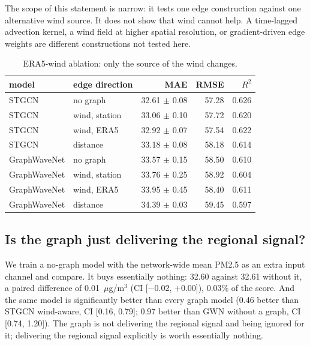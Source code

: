 \documentclass[11pt,a4paper]{article}
\begin{document}
The scope of this statement is narrow: it tests one edge construction against
one alternative wind source.  It does not show that wind cannot help.  A
time-lagged advection kernel, a wind field at higher spatial resolution, or
gradient-driven edge weights are different constructions not tested here.

\begin{table}[htbp]
\centering
\caption{ERA5-wind ablation: only the source of the wind changes.}
\label{tab:era5}
\begin{tabular}{llrrr}
\toprule
model & edge direction & MAE & RMSE & $R^2$ \\
\midrule
STGCN          & no graph         & 32.61 $\pm$ 0.08 & 57.28 & 0.626 \\
STGCN          & wind, station    & 33.06 $\pm$ 0.10 & 57.72 & 0.620 \\
STGCN          & wind, ERA5       & 32.92 $\pm$ 0.07 & 57.54 & 0.622 \\
STGCN          & distance         & 33.18 $\pm$ 0.08 & 58.18 & 0.614 \\
GraphWaveNet   & no graph         & 33.57 $\pm$ 0.15 & 58.50 & 0.610 \\
GraphWaveNet   & wind, station    & 33.76 $\pm$ 0.25 & 58.92 & 0.604 \\
GraphWaveNet   & wind, ERA5       & 33.95 $\pm$ 0.45 & 58.40 & 0.611 \\
GraphWaveNet   & distance         & 34.39 $\pm$ 0.03 & 59.45 & 0.597 \\
\bottomrule
\end{tabular}
\end{table}

\subsection{Is the graph just delivering the regional signal?}

We train a no-graph model with the network-wide mean PM2.5 as an extra input
channel and compare.  It buys essentially nothing: 32.60 against 32.61 without
it, a paired difference of 0.01~$\mu$g/m$^3$ (CI [$-$0.02, $+$0.00]), 0.03\%
of the score.  And the same model is significantly better than every graph
model (0.46 better than STGCN wind-aware, CI [0.16, 0.79]; 0.97 better than
GWN without a graph, CI [0.74, 1.20]).  The graph is not delivering the
regional signal and being ignored for it; delivering the regional signal
explicitly is worth essentially nothing.
\end{document}
